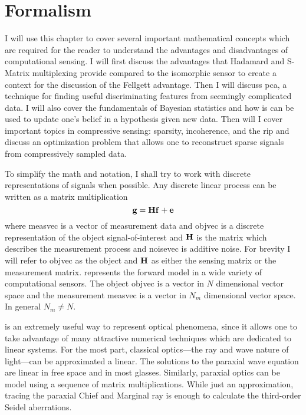 \chapter{Formalism}\label{chap:Formalism}

I will use this chapter to cover several important mathematical concepts which are required for the reader to understand the advantages and disadvantages of computational sensing. I will first discuss the advantages that Hadamard and S-Matrix multiplexing provide compared to the isomorphic sensor to create a context for the discussion of the Fellgett advantage. Then I will discuss \acrfull{pca}, a technique for finding useful discriminating features from seemingly complicated data. I will also cover the fundamentals of Bayesian statistics and how is can be used to update one's belief in a hypothesis given new data. Then will I cover important topics in compressive sensing: sparsity, incoherence, and the \acrfull{rip} and discuss an optimization problem that allows one to reconstruct sparse signals from compressively sampled data. 

To simplify the math and notation, I shall try to work with discrete representations of signals when possible. Any discrete linear process can be written as a matrix multiplication
%
\begin{equation}
	\mathbf{g} = \mathbf{H}\mathbf{f} + \mathbf{e}	
\label{eq:gHf}
\end{equation}
%
where \gls{measvec} is a vector of measurement data and \gls{objvec} is a discrete representation of the object signal-of-interest and $\mathbf{H}$ is the matrix which describes the measurement process and \gls{noisevec} is additive noise. For brevity I will refer to \gls{objvec} as the object and $\mathbf{H}$ as either the sensing matrix or the measurement matrix.  represents the forward model in a wide variety of computational sensors. The object \gls{objvec} is a vector in $N$ dimensional vector space and the measurement \gls{measvec} is a vector in $N_m$ dimensional vector space. In general $N_m \neq N$. 

 is an extremely useful way to represent optical phenomena, since it allows one to take advantage of many attractive numerical techniques which are dedicated to linear systems. For the most part, classical optics---the ray and wave nature of light---can be approximated a linear. 
The solutions to the paraxial wave equation are linear in free space and in most glasses. Similarly, paraxial optics can be model using a sequence of matrix multiplications. While just an approximation, tracing the paraxial Chief and Marginal ray is enough to calculate the third-order Seidel aberrations. 



